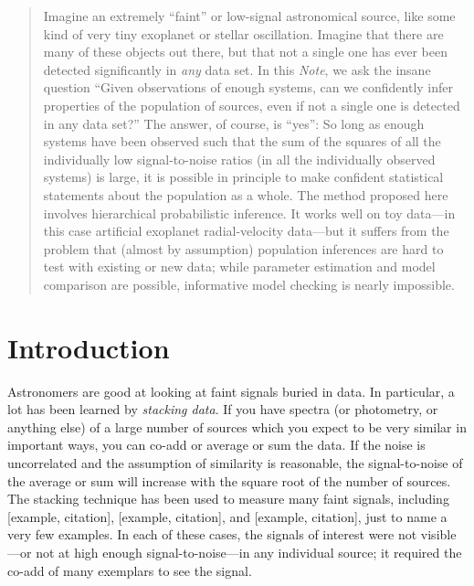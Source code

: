 \documentclass[12pt]{article}
\newcommand{\documentname}{\textsl{Note}}
\begin{document}
\begin{abstract}
Imagine an extremely ``faint'' or low-signal astronomical source, like
some kind of very tiny exoplanet or stellar oscillation.  Imagine that
there are many of these objects out there, but that not a single one
has ever been detected significantly in \emph{any} data set.  In this
\documentname, we ask the insane question ``Given observations of
enough systems, can we confidently infer properties of the population
of sources, even if not a single one is detected in any data set?''
The answer, of course, is ``yes'': So long as enough systems have been
observed such that the sum of the squares of all the individually low
signal-to-noise ratios (in all the individually observed systems) is
large, it is possible in principle to make confident statistical
statements about the population as a whole.  The method proposed here
involves hierarchical probabilistic inference.  It works well on toy
data---in this case artificial exoplanet radial-velocity data---but it
suffers from the problem that (almost by assumption) population
inferences are hard to test with existing or new data; while parameter
estimation and model comparison are possible, informative model
checking is nearly impossible.
\end{abstract}

\section{Introduction}

Astronomers are good at looking at faint signals buried in data.
In particular, a lot has been learned by \emph{stacking data}.
If you have spectra (or photometry, or anything else) of a large number of sources
which you expect to be very similar in important ways, you can co-add or average or sum
the data.
If the noise is uncorrelated and the assumption of similarity is reasonable,
the signal-to-noise of the average or sum will increase with the square root of
the number of sources.
The stacking technique has been used to measure many faint signals, including
[example, citation], [example, citation], and [example, citation], just to name
a very few examples.
In each of these cases, the signals of interest were not visible---or not at
high enough signal-to-noise---in any individual source; it required the co-add of
many exemplars to see the signal.
\end{document}
